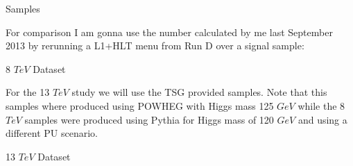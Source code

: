 \documentclass[8pt]{beamer}
\begin{document}
\begin{frame}{Samples}

For comparison I am gonna use the number calculated by me last September 2013 by rerunning a L1+HLT menu from Run D over a signal sample:

\begin{block}{8 $TeV$ Dataset}


\end{block}

For the 13 $TeV$ study we will use the TSG provided samples. Note that this samples where produced using POWHEG with 
Higgs mass 125 $GeV$ while the 8 $TeV$ samples were produced using Pythia for Higgs mass of 120 $GeV$ and using a 
different PU scenario.

\begin{block}{13 $TeV$ Dataset}


\end{block}
 
\end{frame}
\end{document}

